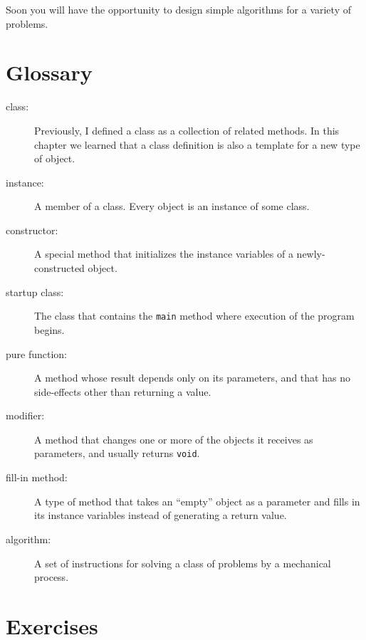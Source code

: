 Soon you will have the opportunity to design
simple algorithms for a variety of problems.


\section{Glossary}

\begin{description}

\item[class:]  Previously, I defined a class as a collection
of related methods.  In this chapter we learned that a class
definition is also a template for a new type of object.

\item[instance:]  A member of a class.  Every object is an
instance of some class.

\item[constructor:]  A special method that initializes the instance
variables of a newly-constructed object.

\item[startup class:]  The class that contains the {\tt main}
method where execution of the program begins.

\item[pure function:]  A method whose result depends only on its
parameters, and that has no side-effects other than returning
a value.

\item[modifier:]  A method that changes one or more of the objects
it receives as parameters, and usually returns {\tt void}.

\item[fill-in method:]  A type of method that takes an ``empty''
object as a parameter and fills in its instance variables instead
of generating a return value.

\item[algorithm:]  A set of instructions for solving a class of
problems by a mechanical process.


\end{description}


\section{Exercises}

